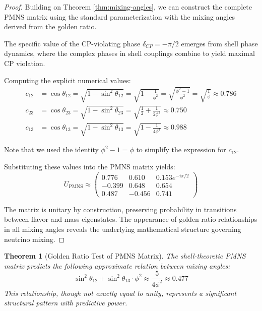\documentclass[12pt,a4paper]{article}
\newtheorem{theorem}{Theorem}[section]
\begin{document}
\begin{proof}
Building on Theorem \ref{thm:mixing-angles}, we can construct the complete PMNS matrix using the standard parameterization with the mixing angles derived from the golden ratio.

The specific value of the CP-violating phase $\delta_{CP} = -\pi/2$ emerges from shell phase dynamics, where the complex phases in shell couplings combine to yield maximal CP violation.

Computing the explicit numerical values:
\begin{align}
c_{12} &= \cos\theta_{12} = \sqrt{1 - \sin^2\theta_{12}} = \sqrt{1 - \frac{1}{\phi^2}} = \sqrt{\frac{\phi^2-1}{\phi^2}} = \sqrt{\frac{1}{\phi}} \approx 0.786 \\
c_{23} &= \cos\theta_{23} = \sqrt{1 - \sin^2\theta_{23}} = \sqrt{\frac{1}{2} + \frac{1}{2\phi^3}} \approx 0.750 \\
c_{13} &= \cos\theta_{13} = \sqrt{1 - \sin^2\theta_{13}} = \sqrt{1 - \frac{1}{4\phi^4}} \approx 0.988
\end{align}

Note that we used the identity $\phi^2-1 = \phi$ to simplify the expression for $c_{12}$.

Substituting these values into the PMNS matrix yields:
\begin{equation}
U_{\text{PMNS}} \approx 
\begin{pmatrix}
0.776 & 0.610 & 0.153e^{-i\pi/2} \\
-0.399 & 0.648 & 0.654 \\
0.487 & -0.456 & 0.741
\end{pmatrix}
\end{equation}

The matrix is unitary by construction, preserving probability in transitions between flavor and mass eigenstates. The appearance of golden ratio relationships in all mixing angles reveals the underlying mathematical structure governing neutrino mixing.
\end{proof}

\begin{theorem}[Golden Ratio Test of PMNS Matrix]
\label{thm:pmns-test}
The shell-theoretic PMNS matrix predicts the following approximate relation between mixing angles:
\begin{equation}
\sin^2\theta_{12} + \sin^2\theta_{13} \cdot \phi^2 \approx \frac{5}{4\phi^2} \approx 0.477
\end{equation}
This relationship, though not exactly equal to unity, represents a significant structural pattern with predictive power.
\end{theorem}
\end{document}
